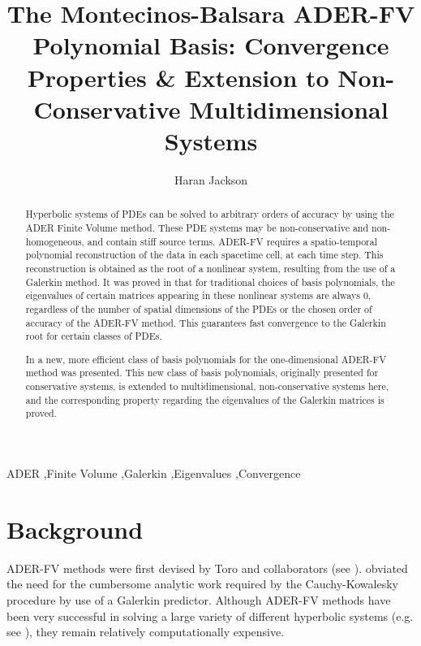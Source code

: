 \documentclass[twoside,english,final,5p,times,twocolumn]{elsarticle}
\begin{document}
\begin{frontmatter}{}

\title{The Montecinos-Balsara ADER-FV Polynomial Basis: Convergence Properties
\& Extension to Non-Conservative Multidimensional Systems}

\author{Haran Jackson}


\address{Cavendish Laboratory, JJ Thomson Ave, Cambridge, UK, CB3 0HE}
\begin{abstract}
Hyperbolic systems of PDEs can be solved to arbitrary orders of accuracy
by using the ADER Finite Volume method. These PDE systems may be non-conservative
and non-homogeneous, and contain stiff source terms. ADER-FV requires
a spatio-temporal polynomial reconstruction of the data in each spacetime
cell, at each time step. This reconstruction is obtained as the root
of a nonlinear system, resulting from the use of a Galerkin method.
It was proved in \citet{Jackson2017} that for traditional choices
of basis polynomials, the eigenvalues of certain matrices appearing
in these nonlinear systems are always 0, regardless of the number
of spatial dimensions of the PDEs or the chosen order of accuracy
of the ADER-FV method. This guarantees fast convergence to the Galerkin
root for certain classes of PDEs.

In \citet{Montecinos2017} a new, more efficient class of basis polynomials
for the one-dimensional ADER-FV method was presented. This new class
of basis polynomials, originally presented for conservative systems,
is extended to multidimensional, non-conservative systems here, and
the corresponding property regarding the eigenvalues of the Galerkin
matrices is proved.
\end{abstract}
\begin{keyword}
ADER \sep Finite Volume \sep Galerkin \sep Eigenvalues \sep Convergence
\end{keyword}

\end{frontmatter}{}

\section{Background}

ADER-FV methods were first devised by Toro and collaborators (see
\citet{Millington2001}). \citet{Dumbser2008} obviated the need for
the cumbersome analytic work required by the Cauchy-Kowalesky procedure
by use of a Galerkin predictor. Although ADER-FV methods have been
very successful in solving a large variety of different hyperbolic
systems (e.g. see \citet{Dumbser2016a,Balsara2009,Hidalgo2011,Zanotti2016}),
they remain relatively computationally expensive.
\end{document}
